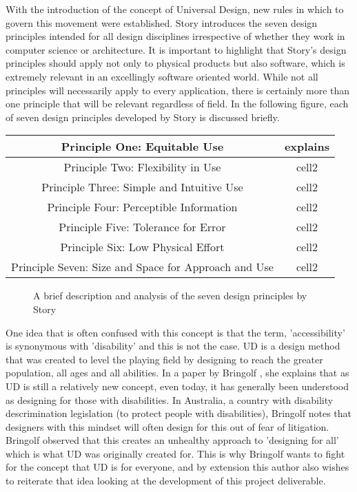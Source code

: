 With the introduction of the concept of Universal Design, new rules in which to govern this movement were established.
Story introduces the seven design principles \cite{sevenprinciples} intended for all design disciplines irrespective of whether they work in computer science or architecture.
It is important to highlight that Story's design principles should apply not only to physical products but also software, which is extremely relevant in an excellingly software oriented world.
While not all principles will necessarily apply to every application, there is certainly more than one principle that will be relevant regardless of field.
In the following figure, each of seven design principles developed by Story is discussed briefly.

\begin{center}
    \begin{tabular}{ |c|c| } 
     \hline
     Principle One: Equitable Use &  explains \\
     \hline
     Principle Two: Flexibility in Use & cell2 \\ 
     \hline
     Principle Three: Simple and Intuitive Use & cell2 \\ 
     \hline
     Principle Four: Perceptible Information & cell2 \\
     \hline 
     Principle Five: Tolerance for Error & cell2 \\ 
     \hline
     Principle Six: Low Physical Effort & cell2 \\ 
     \hline
     Principle Seven: Size and Space for Approach and Use & cell2 \\
     \hline
    \end{tabular}
\end{center}

\begin{figure}
    \caption{A brief description and analysis of the seven design principles by Story\cite{sevenprinciples}}
    \label{fig:DesignPrinciples}
\end{figure}

One idea that is often confused with this concept is that the term, 'accessibility' is synonymous with 'disability' and this is not the case.
UD is a design method that was created to level the playing field by designing to reach the greater population, all ages and all abilities.
In a paper by Bringolf \cite{accessible}, she explains that as UD is still a relatively new concept, even today, it has generally been understood as designing for those with disabilities.
In Australia, a country with disability descrimination legislation (to protect people with disabilities), Bringolf notes that designers with this mindset will often design for this out of fear of litigation.
Bringolf observed that this creates an unhealthy approach to 'designing for all' which is what UD was originally created for. %
This is why Bringolf wants to fight for the concept that UD is for everyone, and by extension this author also wishes to reiterate that idea looking at the development of this project deliverable. %

